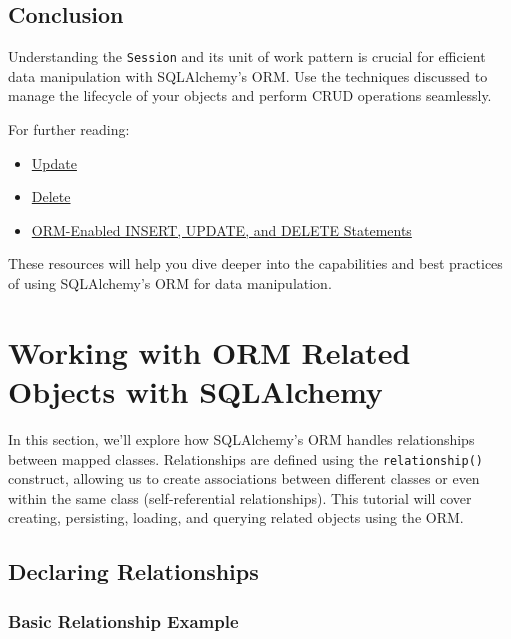 \documentclass[
  letterpaper,
  DIV=11,
  numbers=noendperiod]{scrreprt}
\providecommand{\tightlist}{%
  \setlength{\itemsep}{0pt}\setlength{\parskip}{0pt}}\usepackage{longtable,booktabs,array}
\begin{document}
\section{Conclusion}\label{conclusion-22}

Understanding the \texttt{Session} and its unit of work pattern is
crucial for efficient data manipulation with SQLAlchemy's ORM. Use the
techniques discussed to manage the lifecycle of your objects and perform
CRUD operations seamlessly.

For further reading:

\begin{itemize}
\tightlist
\item
  \href{https://docs.sqlalchemy.org/en/14/core/dml.html\#sqlalchemy.sql.expression.Update}{Update}
\item
  \href{https://docs.sqlalchemy.org/en/14/core/dml.html\#sqlalchemy.sql.expression.Delete}{Delete}
\item
  \href{https://docs.sqlalchemy.org/en/14/orm/query.html\#orm-enabled-insert-update-and-delete}{ORM-Enabled
  INSERT, UPDATE, and DELETE Statements}
\end{itemize}

These resources will help you dive deeper into the capabilities and best
practices of using SQLAlchemy's ORM for data manipulation.


\chapter{Working with ORM Related Objects with
SQLAlchemy}\label{working-with-orm-related-objects-with-sqlalchemy}

In this section, we'll explore how SQLAlchemy's ORM handles
relationships between mapped classes. Relationships are defined using
the \texttt{relationship()} construct, allowing us to create
associations between different classes or even within the same class
(self-referential relationships). This tutorial will cover creating,
persisting, loading, and querying related objects using the ORM.

\section{Declaring Relationships}\label{declaring-relationships}

\subsection{Basic Relationship
Example}\label{basic-relationship-example}
\end{document}
